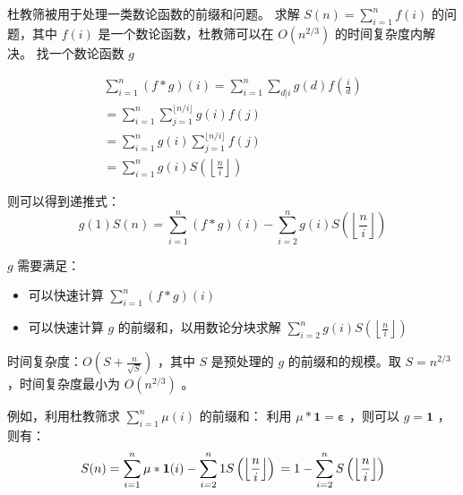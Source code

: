 杜教筛被用于处理一类数论函数的前缀和问题。
求解 $S(n) = \sum_{i=1}^n f(i)$ 的问题，其中 $f(i)$ 是一个数论函数，杜教筛可以在 $O(n^{2/3})$ 的时间复杂度内解决。
找一个数论函数 $g$ 

$$\begin{gathered}\sum_{i=1}^n(f*g)(i)=\sum_{i=1}^n\sum_{d|i}g(d)f\left(\frac id\right)\\
=\sum_{i=1}^n\sum_{j=1}^{\lfloor n/i\rfloor}g(i)f(j) \\
=\sum_{i=1}^ng(i)\sum_{j=1}^{\lfloor n/i\rfloor}f(j) \\
=\sum_{i=1}^ng(i)S\left(\left\lfloor\frac ni\right\rfloor\right) 
\end{gathered}$$

则可以得到递推式：
$$g(1)S(n)=\sum_{i=1}^n(f*g)(i)-\sum_{i=2}^ng(i)S\left(\left\lfloor\frac ni\right\rfloor\right)$$

$g$ 需要满足：
\begin{itemize}
    \item 可以快速计算 $\sum_{i=1}^n (f*g)(i)$
    \item 可以快速计算 $g$ 的前缀和，以用数论分块求解 $\sum_{i=2}^ng(i)S\left(\left\lfloor\frac ni\right\rfloor\right)$
\end{itemize}

时间复杂度：$O(S+\frac{n}{\sqrt{S}})$ ，其中 $S$ 是预处理的 $g$ 的前缀和的规模。取 $S=n^{2/3}$ ，时间复杂度最小为 $O(n^{2/3})$ 。

例如，利用杜教筛求 $\sum_{i=1}^n\mu(i)$ 的前缀和：
利用 $\mu * \mathbf{1} = \mathbf{\varepsilon}$ ，则可以 $g=\mathbf{1}$ ，则有：
$$S(n) = \sum_{i=1}^n{\mu*\mathbf{1}}(i) - \sum_{i=2}^n 1S\left(\left\lfloor\frac ni\right\rfloor\right)\\
=1 - \sum_{i=2}^n S\left(\left\lfloor\frac ni\right\rfloor\right)
$$